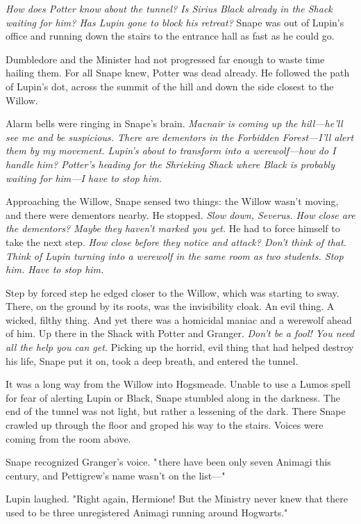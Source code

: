 \emph{How does Potter know about the tunnel? Is Sirius Black already in the Shack waiting for him? Has Lupin gone to block his retreat?} Snape was out of Lupin's office and running down the stairs to the entrance hall as fast as he could go.

Dumbledore and the Minister had not progressed far enough to waste time hailing them. For all Snape knew, Potter was dead already. He followed the path of Lupin's dot, across the summit of the hill and down the side closest to the Willow.

Alarm bells were ringing in Snape's brain. \emph{Macnair is coming up the hill—he'll see me and be suspicious. There are dementors in the Forbidden Forest—I'll alert them by my movement. Lupin's about to transform into a werewolf—how do I handle him? Potter's heading for the Shrieking Shack where Black is probably waiting for him—I have to stop him.}

Approaching the Willow, Snape sensed two things: the Willow wasn't moving, and there were dementors nearby. He stopped. \emph{Slow down, Severus. How close are the dementors? Maybe they haven't marked you yet.} He had to force himself to take the next step. \emph{How close before they notice and attack? Don't think of that. Think of Lupin turning into a werewolf in the same room as two students. Stop him. Have to stop him.}

Step by forced step he edged closer to the Willow, which was starting to sway. There, on the ground by its roots, was the invisibility cloak. An evil thing. A wicked, filthy thing. And yet there was a homicidal maniac and a werewolf ahead of him. Up there in the Shack with Potter and Granger. \emph{Don't be a fool! You need all the help you can get.} Picking up the horrid, evil thing that had helped destroy his life, Snape put it on, took a deep breath, and entered the tunnel.

It was a long way from the Willow into Hogsmeade. Unable to use a Lumos spell for fear of alerting Lupin or Black, Snape stumbled along in the darkness. The end of the tunnel was not light, but rather a lessening of the dark. There Snape crawled up through the floor and groped his way to the stairs. Voices were coming from the room above.

Snape recognized Granger's voice. "{\el}\,there have been only seven Animagi this century, and Pettigrew's name wasn't on the list—"

Lupin laughed. "Right again, Hermione! But the Ministry never knew that there used to be three unregistered Animagi running around Hogwarts."

